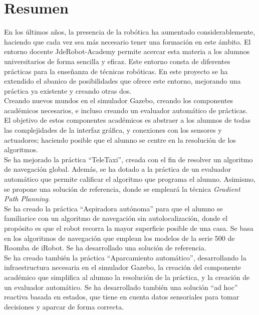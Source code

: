 \chapter*{Resumen}

En los últimos años, la presencia de la robótica ha aumentado considerablemente, haciendo que cada vez sea más necesario tener una formación en este ámbito. El entorno docente JdeRobot-Academy permite acercar esta materia a los alumnos universitarios de forma sencilla y eficaz. Este entorno consta de diferentes prácticas para la enseñanza de técnicas robóticas. En este proyecto se ha extendido el abanico de posibilidades que ofrece este entorno, mejorando una práctica ya existente y creando otras dos.\\

Creando nuevos mundos en el simulador Gazebo, creando los componentes académicos necesarios, e incluso creando un evaluador automático de prácticas. El objetivo de estos componentes académicos es abstraer a los alumnos de todas las complejidades de la interfaz gráfica, y conexiones con los sensores y actuadores; haciendo posible que el alumno se centre en la resolución de los algoritmos.\\

Se ha mejorado la práctica ``TeleTaxi'', creada con el fin de resolver un algoritmo de navegación global. Además, se ha dotado a la práctica de un evaluador automático que permite calificar el algoritmo que programa el alumno. Asimismo, se propone una solución de referencia, donde se empleará la técnica \textit{Gradient Path Planning}.\\

Se ha creado la práctica ``Aspiradora autónoma'' para que el alumno se familiarice con un algoritmo de navegación sin autolocalización, donde el propósito es que el robot recorra la mayor superficie posible de una casa. Se basa en los algoritmos de navegación que emplean los modelos de la serie 500 de Roomba de iRobot. Se ha desarrollado una solución de referencia.\\

Se ha creado también la práctica ``Aparcamiento automático'', desarrollando la infraestructura necesaria en el simulador Gazebo, la creación del componente académico que simplifica al alumno la resolución de la práctica, y la creación de un evaluador automático. Se ha desarrollado también una solución “ad hoc” reactiva basada en estados, que tiene en cuenta datos sensoriales para tomar decisiones y aparcar de forma correcta.